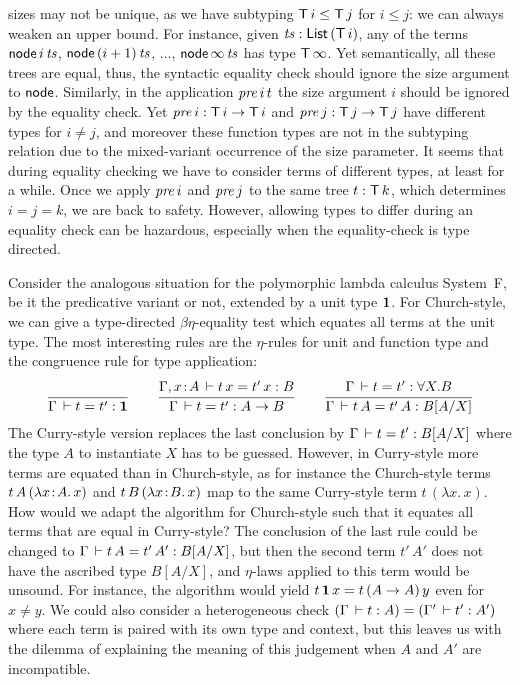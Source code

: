 \documentclass[acmlarge,review,anonymous]{acmart}\settopmatter{printfolios=true}
\begin{document}
sizes may not be unique, as we have subtyping $\mathsf{T}\,i \leq \mathsf{T}\,j$ for
$i \leq j$: we can always weaken an upper bound.  For instance, given
$\mathit{ts} : \mathsf{List}\,(\mathsf{T}\,i)$, any of the terms
$\mathsf{node}\,i\,\mathit{ts}$, $\mathsf{node}\,(i+1)\,\mathit{ts}$, $\dots$, $\mathsf{node}\,\infty\,\mathit{ts}$
has type
$\mathsf{T}\,\infty$.  Yet semantically, all these trees are equal,
thus, the syntactic equality check should ignore the size argument to
$\mathsf{node}$.  Similarly, in the application $\mathit{pre}\,i\,t$ the size
argument $i$ should be ignored by the equality check.  Yet
$\mathit{pre}\,i : \mathsf{T}\,i \to \mathsf{T}\,i$ and $\mathit{pre}\,j : \mathsf{T}\,j \to \mathsf{T}\,j$ have
different types for $i \not= j$, and moreover these function types are
not in the subtyping relation due to the mixed-variant occurrence of the
size parameter.  It seems that during equality checking we have to
consider terms of different types, at least for a while.  Once we apply
$\mathit{pre}\,i$ and $\mathit{pre}\,j$ to the same tree $t : \mathsf{T}\,k$, which
determines $i = j = k$, we are back to safety.  However, allowing
types to differ during an equality check can be hazardous, especially
when the equality-check is type directed.

Consider the analogous situation for the polymorphic lambda calculus System~F, be it the predicative variant or not, extended by a unit type $\mathbf{1}$.
For Church-style, we can give a type-directed $\beta\eta$-equality test which equates all terms at the unit type.  The most interesting rules are the $\eta$-rules for unit and function type and the congruence rule for type application:
\begin{gather*}
\renewcommand{\jchk}{:}
\renewcommand{\jinf}{:}
  \ru{}{\Gamma \der t = t' \jchk \One}
\qquad
  \ru{\Gamma, x \of A \der t\,x = t'\,x \jchk B
    }{\Gamma \der t = t' \jchk A \to B}
\qquad
  \ru{\Gamma \der t = t' \jinf \forall X. B
    }{\Gamma \der t\,A = t'\,A \jinf B[A/X]}
\end{gather*}
The Curry-style version replaces the last conclusion by $\Gamma \,\vdash t = t' : B[A/X]$ where the type $A$ to instantiate $X$ has to be guessed.  However, in Curry-style more terms are equated than in Church-style, as for instance the Church-style terms $t\,A\,(\lambda x \!:\! A.\, x)$ and $t\,B\,(\lambda x \!:\! B.\, x)$ map to the same Curry-style term $t\,(\lambda x.\,x)$.  How would we adapt the algorithm for Church-style such that it equates all terms that are equal in Curry-style?  The conclusion of the last rule could be changed to $\Gamma \,\vdash t\,A = t'\,A' : B[A/X]$, but then the second term $t'\,A'$ does not have the ascribed type $B[A/X]$, and $\eta$-laws applied to this term would be unsound.  For instance, the algorithm would yield $t\,\mathbf{1}\,x = t\,(A \to A)\,y$ even for $x \not= y$.
We could also consider a heterogeneous check $(\Gamma \,\vdash t : A) = (\Gamma' \,\vdash t' : A')$ where each term is paired with its own type and context, but this leaves us with the dilemma of explaining the meaning of this judgement when $A$ and $A'$ are incompatible.
\end{document}
